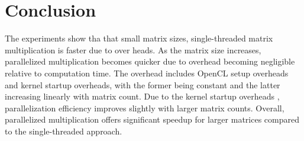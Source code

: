 \section{Conclusion}

The experiments show tha that small matrix sizes, single-threaded matrix multiplication is faster due to over heads.
As the matrix size increases, parallelized multiplication becomes quicker due to overhead becoming negligible relative to computation time.
The overhead includes OpenCL setup overheads and kernel startup overheads, with the former being constant and the latter increasing linearly with matrix count.
Due to the kernel startup overheads , parallelization efficiency improves slightly with larger matrix counts.
Overall, parallelized multiplication offers significant speedup for larger matrices compared to the single-threaded approach.